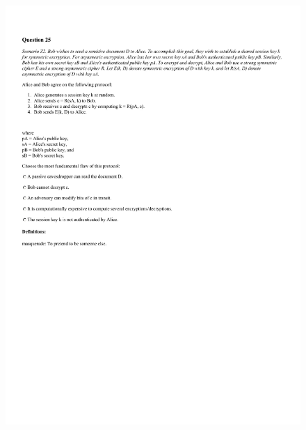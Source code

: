 \begin{figure}[!h]
    \begin{center}
    \advance\leftskip-3cm
    \advance\rightskip-3cm
    \includegraphics[scale=.25]{images/exam/correctly_formated_exam-11.jpg}
    \label{fig:correctly_formated_exam-11}
\end{center}
\end{figure}
